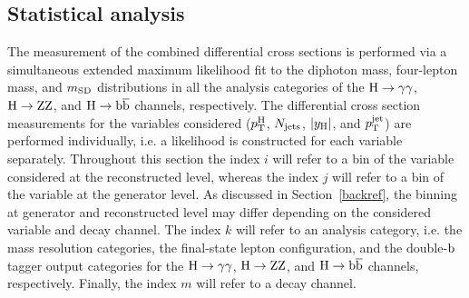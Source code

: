 \subsection{Statistical analysis}
\label{sec:stat}

The measurement of the combined differential cross sections is performed via a simultaneous extended maximum likelihood fit to the diphoton mass, four-lepton mass, and $m_\mathrm{SD}$ distributions in all the analysis categories of the $\mathrm{H}\to\mathrm{\gamma}\mathrm{\gamma}$, $\mathrm{H}\to\mathrm{Z}\mathrm{Z}$, and $\mathrm{H}\to\mathrm{b}\overline{\mathrm{b}}$ channels, respectively.
% 
The differential cross section measurements for the variables considered ($p_\mathrm{T}^\mathrm{H}$, $N_\text{jets} $, $\left|y_\mathrm{H}\right| $, and $p_\mathrm{T}^\text{jet} $) are performed individually, i.e. a likelihood is constructed for each variable separately.
% 
Throughout this section the index $i$ will refer to a bin of the variable considered at the reconstructed level, whereas the index $j$ will refer to a bin of the variable at the generator level.
% 
As discussed in Section~\ref{backref}, the binning at generator and reconstructed level may differ depending on the considered variable and decay channel.
% 
The index $k$ will refer to an analysis category, i.e. the mass resolution categories, the final-state lepton configuration, and the double-$\mathrm{b}$ tagger output categories for the $\mathrm{H}\to\mathrm{\gamma}\mathrm{\gamma}$, $\mathrm{H}\to\mathrm{Z}\mathrm{Z}$, and $\mathrm{H}\to\mathrm{b}\overline{\mathrm{b}}$ channels, respectively.
% 
Finally, the index $m$ will refer to a decay channel.


